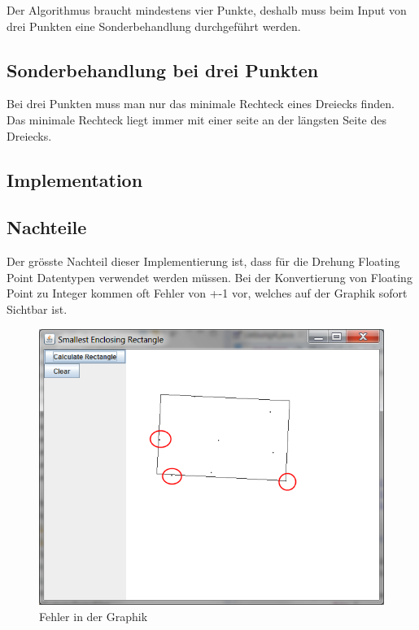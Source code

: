 \documentclass[10pt]{article}
\begin{document}
Der Algorithmus braucht mindestens vier Punkte, deshalb muss beim Input von drei Punkten eine Sonderbehandlung durchgeführt werden.

\subsection{Sonderbehandlung bei drei Punkten}
Bei drei Punkten muss man nur das minimale Rechteck eines Dreiecks finden. Das minimale Rechteck liegt immer mit einer seite an der längsten Seite des Dreiecks.

\subsection{Implementation}

\subsection{Nachteile}
Der grösste Nachteil dieser Implementierung ist, dass für die Drehung Floating Point Datentypen verwendet werden müssen. Bei der Konvertierung von Floating Point zu Integer kommen oft Fehler von +-1 vor, welches auf der Graphik sofort Sichtbar ist.
\begin{figure} [h!]

\includegraphics[scale= 0.75]{screenshot.png}
\caption{Fehler in der Graphik}
\end{figure}

\end{document}
